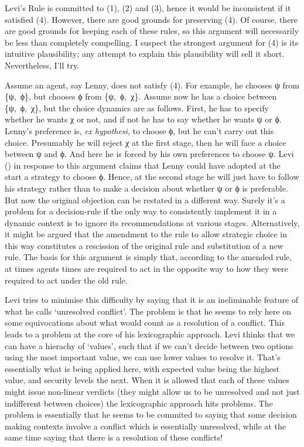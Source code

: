 \documentclass[
  10pt,
  letterpaper,
  DIV=11,
  numbers=noendperiod,
  twoside]{scrartcl}
\begin{document}
Levi's Rule is committed to (1), (2) and (3), hence it would be
inconsistent if it satisfied (4). However, there are good grounds for
preserving (4). Of course, there are good grounds for keeping each of
these rules, so this argument will necessarily be less than completely
compelling. I suspect the strongest argument for (4) is its intuitive
plausibility; any attempt to explain this plausibility will sell it
short. Nevertheless, I'll try.

Assume an agent, say Lenny, does not satisfy (4). For example, he
chooses ψ from \{ψ,~ϕ\}, but chooses ϕ from \{ψ,~ϕ,~χ\}. Assume now he
has a choice between \{ψ,~ϕ,~χ\}, but the choice dynamics are as
follows. First, he has to specify whether he wants χ or not, and if not
he has to say whether he wants ψ or ϕ. Lenny's preference is, \emph{ex
hypothesi}, to choose ϕ, but he can't carry out this choice. Presumably
he will reject χ at the first stage, then he will face a choice between
ψ and ϕ. And here he is forced by his own preferences to choose ψ. Levi
() in response to this argument claims that
Lenny could have adopted at the start a strategy to choose ϕ. Hence, at
the second stage he will just have to follow his strategy rather than to
make a decision about whether ψ or ϕ is preferable. But now the original
objection can be restated in a different way. Surely it's a problem for
a decision-rule if the only way to consistently implement it in a
dynamic context is to ignore its recommendations at various stages.
Alternatively, it might be argued that the amendment to the rule to
allow strategic choice in this way constitutes a rescission of the
original rule and substitution of a new rule. The basis for this
argument is simply that, according to the amended rule, at times agents
times are required to act in the opposite way to how they were required
to act under the old rule.

Levi tries to minimise this difficulty by saying that it is an
ineliminable feature of what he calls `unresolved conflict'. The problem
is that he seems to rely here on some equivocations about what would
count as a resolution of a conflict. This leads to a problem at the core
of his lexicographic approach. Levi thinks that we can have a hierachy
of `values', such that if we can't decide between two options using the
most important value, we can use lower values to resolve it. That's
essentially what is being applied here, with expected value being the
highest value, and security levels the next. When it is allowed that
each of these values might issue non-linear verdicts (they might allow
us to be unresolved and not just indifferent between choices) the
lexicographic approach hits problems. The problem is essentially that he
seems to be commited to saying that some decision making contexts
involve a conflict which is essentially unresolved, while at the same
time saying that there is a resolution of these conflicts!
\end{document}
